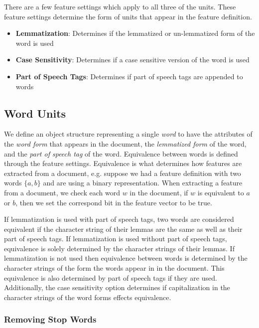 \documentclass[11pt]{article}
\begin{document}
There are a few feature settings which apply to all three of the units. These feature settings determine the form of units that appear in the feature definition. 

\begin{itemize}
 \item \textbf{Lemmatization}: Determines if the lemmatized or un-lemmatized form of the word is used
 \item \textbf{Case Sensitivity}: Determines if a case sensitive version of the word is used
 \item \textbf{Part of Speech Tags}: Determines if part of speech tags are appended to words
 \end{itemize}
 
 
\subsection{Word Units}

We define an object structure representing a single \emph{word} to have the attributes of the \emph{word form} that appears in the document, the \emph{lemmatized form} of the word, and the \emph{part of speech tag} of the word. Equivalence between words is defined through the feature settings. Equivalence is what determines how features are extracted from a document, e.g. suppose we had a feature definition with two words $\{a,b\}$ and are using a binary representation. When extracting a feature from a document, we check each word $w$ in the document, if $w$ is equivalent to $a$ or $b$, then we set the correspond bit in the feature vector to be true. 

If lemmatization is used with part of speech tags, two words are considered equivalent if the character string of their lemmas are the same as well as their part of speech tags. If lemmatization is used without part of speech tags, equivalence is solely determined by the character strings of their lemmas.  If lemmatization is not used then equivalence between words is determined by the character strings of the form the words appear in in the document. This equivalence is also determined by part of speech tags if they are used. Additionally, the case sensitivity option determines if capitalization in the character strings of the word forms effects equivalence. 

\subsubsection{Removing Stop Words}
\end{document}
